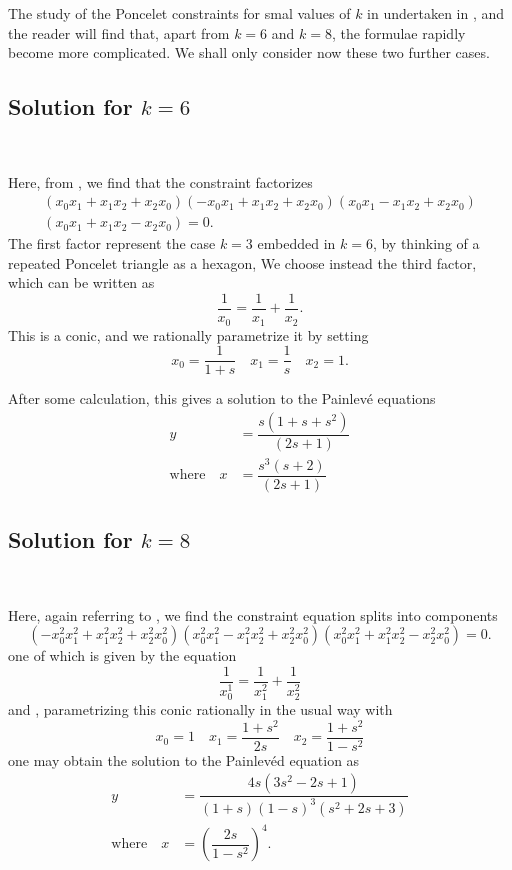 The study of the Poncelet constraints for smal values of $k$ in undertaken in \cite{art7-key1}, and the reader will find that, apart from $k=6$ and $k=8$, the formulae
rapidly become more complicated. We shall only consider now these two further cases.

\subsection{Solution for \boldmath$k=6$}\label{art7-subsec-6.4}
\pageoriginale
~

\smallskip
\noindent
Here, from \cite{art7-key1}, we find that the constraint factorizes
\begin{equation*}
\begin{split}
(x_{0}x_{1} + x_{1}x_{2} +x_{2}x_{0})(-x_{0}x_{1}+x_{1}x_{2}+x_{2}x_{0})(x_{0}x_{1}-x_{1}x_{2}+x_{2}x_{0})\\
(x_{0}x_{1}+x_{1}x_{2}-x_{2}x_{0})=0.
\end{split}
\end{equation*}
The first factor represent the case $k=3$ embedded in $k=6$, by thinking of a repeated Poncelet triangle as a hexagon, We choose instead the third factor, which can be written as
$$
\dfrac{1}{x_{0}} = \dfrac{1}{x_{1}}+\dfrac{1}{x_{2}}.
$$
This is a conic, and we rationally parametrize it by setting
$$
x_{0}=\dfrac{1}{1+s} \quad x_{1}=\dfrac{1}{s}\quad x_{2}=1.
$$ 

After some calculation, this gives a solution to the Painlev\'e equations
\begin{align*}
y&=\dfrac{s(1+s+s^{2})}{(2s+1)}\\
\text{where} \quad x &= \dfrac{s^{3}(s+2)}{(2s+1)}
\end{align*}

\subsection{Solution for \boldmath$k=8$}\label{art7-subsec-6.5}
~

\smallskip
\noindent
Here, again referring to \cite{art7-key1}, we find the constraint equation splits into components
$$
(-x_{0}^{2}x_{1}^{2} + x_{1}^{2}x_{2}^{2} + x_{2}^{2}x_{0}^{2})(x_{0}^{2}x_{1}^{2} - x_{1}^{2}x_{2}^{2}+x_{2}^{2}x_{0}^{2})
(x_{0}^{2}x_{1}^{2} + x_{1}^{2}x_{2}^{2} - x_{2}^{2}x_{0}^{2}) =0.
$$
one of which is given by the equation
$$
\dfrac{1}{x_{0}^{1}}= \dfrac{1}{x_{1}^{2}}+\dfrac{1}{x_{2}^{2}}
$$
and , parametrizing this conic rationally in the usual way with
$$
x_{0}=1 \quad x_{1}=\dfrac{1+s^{2}}{2s} \quad x_{2}= \dfrac{1+s^{2}}{1-s^{2}}
$$
one may obtain the solution to the Painlev\'ed equation as
\begin{align*}
y&= \dfrac{4s(3s^{2}-2s+1)}{(1+s)(1-s)^{3}(s^{2}+2s+3)}\\
\text{where} \quad x &= \left(\dfrac{2s}{1-s^{2}}\right)^{4}.
\end{align*}


